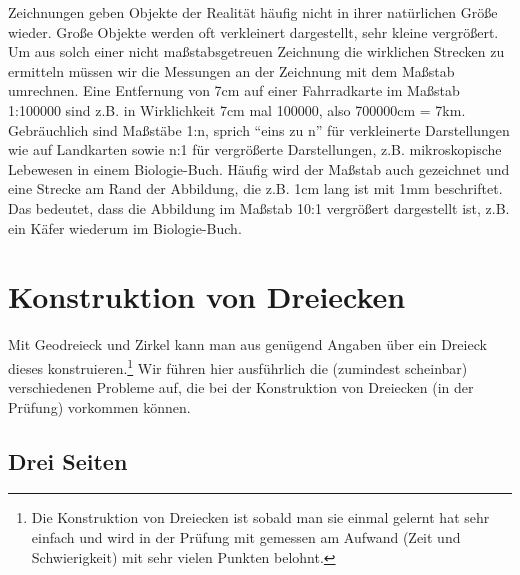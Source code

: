 \documentclass[a4paper]{book}%
\theoremstyle{definition}
\begin{document}
Zeichnungen geben Objekte der Realität häufig nicht in ihrer natürlichen Größe wieder. Große Objekte werden oft verkleinert dargestellt, sehr kleine vergrößert. Um aus solch einer nicht maßstabsgetreuen Zeichnung die wirklichen Strecken zu ermitteln müssen wir die Messungen an der Zeichnung mit dem Maßstab umrechnen. Eine Entfernung von 7cm auf einer Fahrradkarte im Maßstab 1:100000 sind z.B. in Wirklichkeit 7cm mal 100000, also 700000cm = 7km. Gebräuchlich sind Maßstäbe 1:n, sprich \enquote{eins zu n} für verkleinerte Darstellungen wie auf Landkarten sowie n:1 für vergrößerte Darstellungen, z.B. mikroskopische Lebewesen in einem Biologie-Buch. Häufig wird der Maßstab auch gezeichnet und eine Strecke am Rand der Abbildung, die z.B. 1cm lang ist mit 1mm beschriftet. Das bedeutet, dass die Abbildung im Maßstab 10:1 vergrößert dargestellt ist, z.B. ein Käfer wiederum im Biologie-Buch.


\section{Konstruktion von Dreiecken}

Mit Geodreieck und Zirkel kann man aus genügend Angaben über ein Dreieck dieses konstruieren.\footnote{Die Konstruktion von Dreiecken ist sobald man sie einmal gelernt hat sehr einfach und wird in der Prüfung mit gemessen am Aufwand (Zeit und Schwierigkeit) mit sehr vielen Punkten belohnt.} Wir führen hier ausführlich die (zumindest scheinbar) verschiedenen Probleme auf, die bei der Konstruktion von Dreiecken (in der Prüfung) vorkommen können.

\subsection{Drei Seiten}
\end{document}
